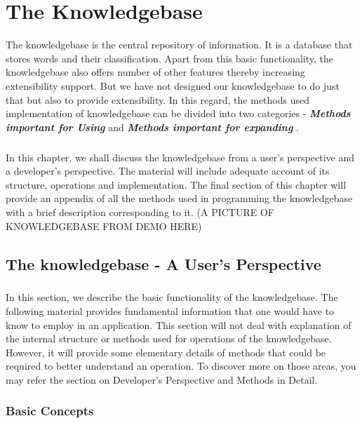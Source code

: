 \chapter{The Knowledgebase}

The knowledgebase is the central repository of information. It is a database that stores words and their classification. Apart from this basic functionality, the knowledgebase also offers number of other features thereby increasing extensibility support. 
But we have not designed our knowledgebase to do just that but also to provide extensibility. In this regard, the methods used implementation of knowledgebase can be divided into two categories - \textbf{\emph{Methods important for Using \libalf}} and \textbf{\emph{Methods important for expanding \libalf}}. 
\paragraph{}
In this chapter, we shall discuss the knowledgebase from a user's perspective and a developer's perspective. The material will include adequate account of its structure, operations and implementation.  The final section of this chapter will provide an appendix of all the methods used in programming the knowledgebase with a brief description corresponding to it.  
\vskip 1pt
(A PICTURE OF KNOWLEDGEBASE FROM DEMO HERE)

\section{The knowledgebase - A User's Perspective}

\paragraph{} In this section, we describe the basic functionality of the knowledgebase. The following material provides fundamental information that one would have to know to employ \libalf in an application. This section will not deal with explanation of the internal structure or methods used for operations of the knowledgebase. However, it will provide some elementary details of methods that could be required to better understand an operation.  To discover more on those areas, you may refer the section on Developer's Perspective and Methods in Detail.

\subsection*{Basic Concepts}
	
